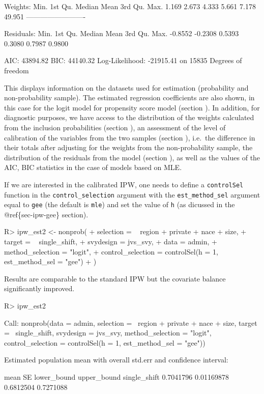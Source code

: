 \documentclass[
]{jss}
\begin{document}
\begin{CodeChunk}
\begin{CodeOutput}
Weights:
   Min. 1st Qu.  Median    Mean 3rd Qu.    Max. 
  1.169   2.673   4.333   5.661   7.178  49.951 
-------------------------

Residuals:
   Min. 1st Qu.  Median    Mean 3rd Qu.    Max. 
-0.8552 -0.2308  0.5393  0.3080  0.7987  0.9800 

AIC: 43894.82
BIC: 44140.32
Log-Likelihood: -21915.41 on 15835 Degrees of freedom
\end{CodeOutput}
\end{CodeChunk}

This displays information on the datasets used for estimation
(probability and non-probability sample). The estimated regression
coefficients are also shown, in this case for the logit model for
propensity score model (section ). In
addition, for diagnostic purposes, we have access to the distribution of
the weights calculated from the inclusion probabilities (section
), an assessment of the level of calibration of the
variables from the two samples (section ),
i.e.~the difference in their totals after adjusting for the weights from
the non-probability sample, the distribution of the residuals from the
model (section ), as well as the values of the AIC, BIC
statistics in the case of models based on MLE.

If we are interested in the calibrated IPW, one needs to define a
\texttt{controlSel} function in the \texttt{control\_selection} argument
with the \texttt{est\_method\_sel} argument equal to \texttt{gee} (the
default is \texttt{mle}) and set the value of \texttt{h} (as dicussed in
the @ref\{sec-ipw-gee\} section).

\begin{CodeChunk}
\begin{CodeInput}
R> ipw_est2 <- nonprob(
+   selection = ~ region + private + nace + size,
+   target = ~ single_shift,
+   svydesign = jvs_svy,
+   data = admin,
+   method_selection = "logit",
+   control_selection = controlSel(h = 1, est_method_sel = "gee")
+ )
\end{CodeInput}
\end{CodeChunk}

Results are comparable to the standard IPW but the covariate balance
significantly improved.

\begin{CodeChunk}
\begin{CodeInput}
R> ipw_est2
\end{CodeInput}
\begin{CodeOutput}

Call:
nonprob(data = admin, selection = ~region + private + nace + 
    size, target = ~single_shift, svydesign = jvs_svy, method_selection = "logit", 
    control_selection = controlSel(h = 1, est_method_sel = "gee"))

Estimated population mean with overall std.err and confidence interval:

                  mean         SE lower_bound upper_bound
single_shift 0.7041796 0.01169878   0.6812504   0.7271088
\end{CodeOutput}
\end{CodeChunk}
\end{document}
